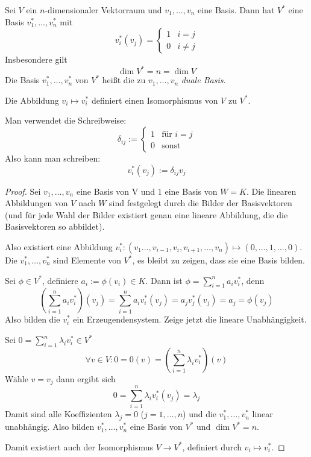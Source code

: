 \documentclass{mycourse}
\begin{document}
\begin{prop} \label{prop: 9.2}
Sei $V$ ein $n$-dimensionaler Vektorraum und $v_1,\dotsc,v_n$ eine Basis.
Dann hat $V^*$ eine Basis $v_1^*,\dotsc,v_n^*$ mit
\[
 \boxed{v_i^*(v_j)=\begin{cases}1&i=j\\0&i\neq j\end{cases}}
\]
Insbesondere gilt
\[
	\dim V^*=n = \dim V
\]
Die Basis $v_1^*,\dotsc,v_n^*$ von $V^*$ heißt die zu $v_1,\dotsc,v_n$ \emph{duale Basis}.

Die Abbildung $v_i\mapsto v_i^*$ definiert einen Isomorphismus von $V$ zu $V^*$.
\begin{note}
Man verwendet die Schreibweise:
\[
\delta_{ij} := \begin{cases} 1 & \text{für } i=j\\ 0 &\text{sonst}\end{cases}
\]
Also kann man schreiben:
\[
	v_{i}^*(v_j):=\delta_{ij}v_j
\]
\end{note}


\begin{proof}
Sei $v_1,\dotsc,v_n$ eine Basis von V und $1$ eine Basis von $W=K$.
Die linearen Abbildungen von $V$ nach $W$ sind festgelegt durch die Bilder der Basisvektoren
(und für jede Wahl der Bilder existiert genau eine lineare Abbildung, die die Basisvektoren so abbildet).

Also existiert eine Abbildung $v_i^*: (v_1\dotsc,v_{i-1},v_i,v_{i+1},\dotsc,v_n) \mapsto (0,\dotsc,1,\dotsc,0)$.
Die $v_{1}^*,\dotsc,v_{n}^*$ sind Elemente von $V^*$, es bleibt zu zeigen, dass sie eine Basis bilden.

Sei $\phi\in V^*$, definiere $a_i :=\phi(v_i)\in K$.
Dann ist $\phi=\sum_{i=1}^na_iv_{i}^*$, denn
\[
\left(\sum_{i=1}^na_iv_{i}^*\right)(v_j)
=\sum_{i=1}^na_iv_{i}^*(v_j)
=a_jv_j^*(v_j) = a_j = \phi(v_j)
\]
Also bilden die $v_{i}^*$ ein Erzeugendensystem.
Zeige jetzt die lineare Unabhängigkeit.

Sei $0=\sum_{i=1}^n\lambda_iv_i^* \in V^*$
\[
\forall v\in V: 0=0(v)=\left(\sum_{i=1}^n\lambda_iv_i^*\right)(v)
\]
Wähle $v=v_j$ dann ergibt sich
\[
0=\sum_{i=1}^n\lambda_iv_i^*(v_j)=\lambda_j
\]
Damit sind alle Koeffizienten $\lambda_j=0$ ($j=1,\dotsc,n$) und die $v_1^*,\dotsc,v_n^*$ linear unabhängig. 
Also bilden $v_1^*,\dotsc,v_n^*$ eine Basis von $V^*$ und $\dim V^*=n$.

Damit existiert auch der Isomorphismus $V\to V^*$, definiert durch $v_i\mapsto v_i^*$.
\end{proof}
\end{prop}
\end{document}
